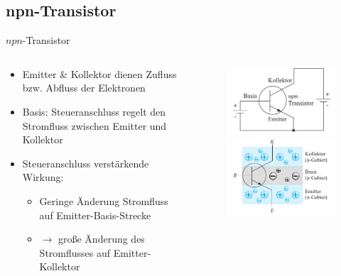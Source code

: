 \documentclass[12pt%
,aspectratio=169%
]{beamer}
\begin{document}
\subsection{npn-Transistor}
\begin{frame}{$npn$-Transistor}
\begin{columns}[T] %
\begin{column}{.48\textwidth}
	\begin{itemize}
		\item Emitter \& Kollektor dienen Zufluss bzw. Abfluss der Elektronen
		\item Basis: Steueranschluss regelt den Stromfluss zwischen Emitter und Kollektor
		\item Steueranschluss verstärkende Wirkung:
		\begin{itemize}
			\item Geringe Änderung Stromfluss auf Emitter-Basis-Strecke
			\item $\to$ große Änderung des Stromflusses auf Emitter-Kollektor
		\end{itemize}
	\end{itemize}
\end{column}%
\hfill%
\begin{column}{.48\textwidth}
\begin{figure}
\center
\includegraphics[scale=0.4]{pictures/npn_schema}\\
\includegraphics[scale=0.4]{pictures/npn_aufbau}
\end{figure}
\end{column}%
\end{columns}
\end{frame}
\end{document}
